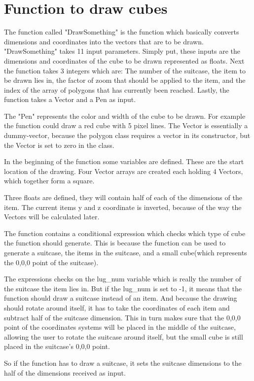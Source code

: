 \section{Function to draw cubes}
\label{sec:cube}
The function called "DrawSomething" is the function which basically converts dimensions and coordinates into the vectors that are to be drawn.
"DrawSomething" takes 11 input parameters. Simply put, these inputs are the dimensions and coordinates of the cube to be drawn represented as floats. Next the function takes 3 integers which are: The number of the suitcase, the item to be drawn lies in, the factor of zoom that should be applied to the item, and the index of the array of polygons that has currently been reached. Lastly, the function takes a Vector and a Pen as input.

The "Pen" represents the color and width of the cube to be drawn. For example the function could draw a red cube with 5 pixel lines. The Vector is essentially a dummy-vector, because the polygon class requires a vector in its constructor, but the Vector is set to zero in the class.

In the beginning of the function some variables are defined. These are the start location of the drawing. Four Vector arrays are created each holding 4 Vectors, which together form a square.

Three floats are defined, they will contain half of each of the dimensions of the item.
The current items y and z coordinate is inverted, because of the way the Vectors will be calculated later. 

The function contains a conditional expression which checks which type of cube the function should generate. This is because the function can be used to generate a suitcase, the items in the suitcase, and a small cube(which represents the 0,0,0 point of the suitcase). 

The expressions checks on the lug\_num variable which is really the number of the suitcase the item lies in. But if the lug\_num is set to -1, it means that the function should draw a suitcase instead of an item. And because the drawing should rotate around itself, it has to take the coordinates of each item and subtract half of the suitcase dimension. This in turn makes sure that the 0,0,0 point of the coordinates systems will be placed in the middle of the suitcase, allowing the user to rotate the suitcase around itself, but the small cube is still placed in the suitcase's 0,0,0 point.

So if the function has to draw a suitcase, it sets the suitcase dimensions to the half of the dimensions received as input.

